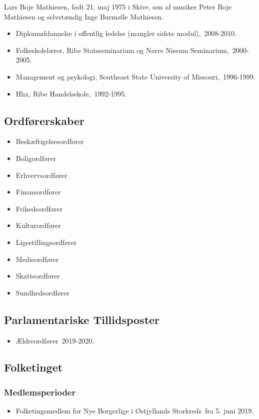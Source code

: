 \documentclass[11pt, a4paper]{awesome-cv}
\begin{document}
\makecvheader[R]
\makelettertitle
\begin{cvletter}
Lars Boje Mathiesen, født 21. maj 1975 i Skive, søn af musiker Peter Boje Mathiesen og selvstændig Inge Burmølle Mathiesen.

\begin{itemize}
\item Diplomuddannelse i offentlig ledelse (mangler sidste modul), 2008-2010.
\item Folkeskolelærer, Ribe Statsseminarium og Nørre Nissum Seminarium, 2000-2005.
\item Management og psykologi, Southeast State University of Missouri, 1996-1999.
\item Hhx, Ribe Handelsskole, 1992-1995.
\end{itemize}
\subsection*{Ordførerskaber}
\begin{itemize}
\item Beskæftigelsesordfører
\item Boligordfører
\item Erhvervsordfører
\item Finansordfører
\item Frihedsordfører
\item Kulturordfører
\item Ligestillingsordfører
\item Medieordfører
\item Skatteordfører
\item Sundhedsordfører
\end{itemize}
\subsection*{Parlamentariske Tillidsposter}
\begin{itemize}
\item Ældreordfører 2019-2020.
\end{itemize}
\subsection*{Folketinget}
\subsubsection*{Medlemsperioder}
\begin{itemize}
\item Folketingsmedlem for Nye Borgerlige i Østjyllands Storkreds fra 5. juni 2019.
\end{itemize}

\end{cvletter}
\end{document}
